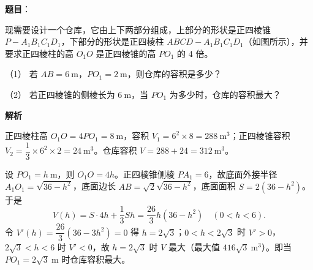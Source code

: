 \begin{answer}

\textbf{题目}：

现需要设计一个仓库，它由上下两部分组成，上部分的形状是正四棱锥 \(P-A_{1}B_{1}C_{1}D_{1}\)，下部分的形状是正四棱柱 \(ABCD-A_{1}B_{1}C_{1}D_{1}\)（如图所示），并要求正四棱柱的高 \(O_{1}O\) 是正四棱锥的高 \(PO_{1}\) 的 4 倍。

（1） 若 \(AB=6\ \mathrm{m}\)，\(PO_{1}=2\ \mathrm{m}\)，则仓库的容积是多少？

（2） 若正四棱锥的侧棱长为 \(6\ \mathrm{m}\)，当 \(PO_{1}\) 为多少时，仓库的容积最大？
\nopagebreak[4]
\begin{center}\end{center}
\nopagebreak[4]
\textbf{解析}


正四棱柱高 \(O_{1}O=4PO_{1}=8\ \mathrm{m}\)，容积 \(V_{1}=6^{2}\times8=288\ \mathrm{m}^{3}\)；正四棱锥容积 \(V_{2}=\dfrac{1}{3}\times6^{2}\times2=24\ \mathrm{m}^{3}\)。仓库容积 \(V=288+24=312\ \mathrm{m}^{3}\)。


设 \(PO_{1}=h\ \mathrm{m}\)，则 \(O_{1}O=4h\)。正四棱锥侧棱 \(PA_{1}=6\)，故底面外接半径 \(A_{1}O_{1}=\sqrt{36-h^{2}}\)，底面边长 \(AB=\sqrt{2}\sqrt{36-h^{2}}\)，底面面积 \(S=2(36-h^{2})\)。于是
\nopagebreak[4]
\[
V(h)=S\cdot 4h+\frac{1}{3}Sh=\frac{26}{3}h(36-h^{2})\quad(0<h<6).
\]
令 \(V'(h)=\dfrac{26}{3}(36-3h^{2})=0\) 得 \(h=2\sqrt{3}\)；\(0<h<2\sqrt{3}\) 时 \(V'>0\)，\(2\sqrt{3}<h<6\) 时 \(V'<0\)，故 \(h=2\sqrt{3}\) 时 \(V\) 最大（最大值 \(416\sqrt{3}\ \mathrm{m}^{3}\)）。即当 \(PO_{1}=2\sqrt{3}\ \mathrm{m}\) 时仓库容积最大。



\end{answer}
